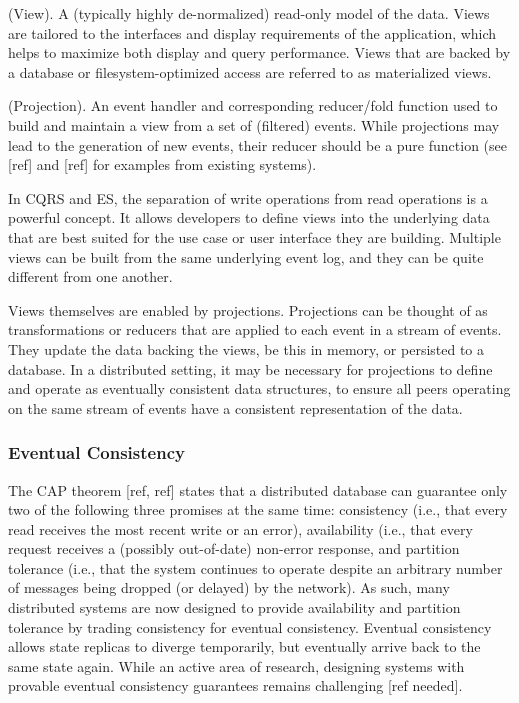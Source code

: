 \documentclass{comjnl}
\begin{document}
\begin{definition}  (View). A (typically highly de-normalized) read-only model of the data. Views are tailored to the interfaces and display requirements of the application, which helps to maximize both display and query performance. Views that are backed by a database or filesystem-optimized access are referred to as materialized views. \end{definition}

\begin{definition} (Projection). An event handler and corresponding reducer/fold function used to build and maintain a view from a set of (filtered) events. While projections may lead to the generation of new events, their reducer should be a pure function (see [ref] and [ref] for examples from existing systems). \end{definition}

In CQRS and ES, the separation of write operations from read operations is a powerful concept. It allows developers to define views into the underlying data that are best suited for the use case or user interface they are building. Multiple views can be built from the same underlying event log, and they can be quite different from one another.

Views themselves are enabled by projections. Projections can be thought of as transformations or reducers that are applied to each event in a stream of events. They update the data backing the views, be this in memory, or persisted to a database. In a distributed setting, it may be necessary for projections to define and operate as eventually consistent data structures, to ensure all peers operating on the same stream of events have a consistent representation of the data.

\subsubsection{Eventual Consistency}

The CAP theorem [ref, ref] states that a distributed database can guarantee only two of the following three promises at the same time: consistency (i.e., that every read receives the most recent write or an error), availability (i.e., that every request receives a (possibly out-of-date) non-error response, and partition tolerance (i.e., that the system continues to operate despite an arbitrary number of messages being dropped (or delayed) by the network). As such, many distributed systems are now designed to provide availability and partition tolerance by trading consistency for eventual consistency. Eventual consistency allows state replicas to diverge temporarily, but eventually arrive back to the same state again. While an active area of research, designing systems with provable eventual consistency guarantees remains challenging [ref needed].
\end{document}
